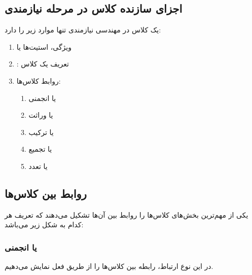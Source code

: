 \subsection{اجزای سازنده کلاس در مرحله نیازمندی}

یک کلاس در مهندسی نیازمندی تنها موارد زیر را دارد:

\begin{enumerate}
    \item ویژگی، استیت‌ها یا 
    \item {}: تعریف یک کلاس
    \item روابط کلاس‌ها:
    \begin{enumerate}
        \item {} یا انجمنی
        \item {} یا وراثت
        \item {} یا ترکیب
        \item {} یا تجمیع
        \item {} یا تعدد
    \end{enumerate}
\end{enumerate}

\subsection{روابط بین کلاس‌ها}

یکی از مهم‌ترین بخش‌های کلاس‌ها را روابط بین آن‌ها تشکیل می‌دهند که تعریف هر
کدام به شکل زیر می‌باشد:

\subsubsection{ یا انجمنی}

در این نوع ارتباط، رابطه بین کلاس‌ها را از طریق فعل نمایش می‌دهیم.








